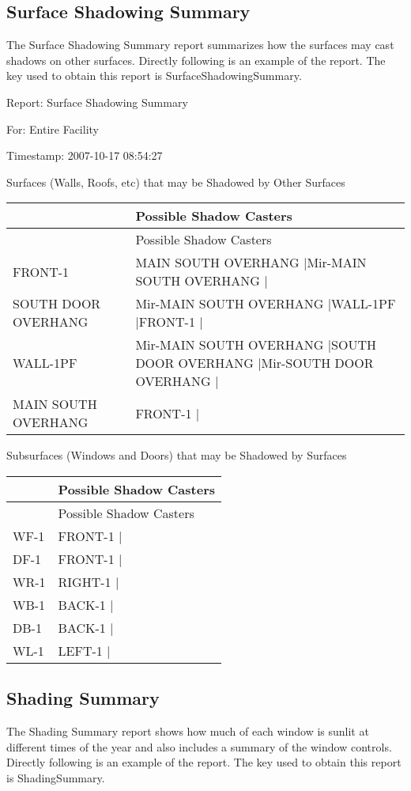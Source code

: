 \subsection{Surface Shadowing Summary}\label{surface-shadowing-summary}

The Surface Shadowing Summary report summarizes how the surfaces may cast shadows on other surfaces. Directly following is an example of the report. The key used to obtain this report is SurfaceShadowingSummary.

Report: Surface Shadowing Summary

For: Entire Facility

Timestamp: 2007-10-17 08:54:27

Surfaces (Walls, Roofs, etc) that may be Shadowed by Other Surfaces

\begin{longtable}[c]{>{\raggedright}p{1.5in}>{\raggedright}p{4.5in}}
\toprule 
~ & Possible Shadow Casters \tabularnewline
\midrule
\endfirsthead

\toprule 
~ & Possible Shadow Casters \tabularnewline
\midrule
\endhead

FRONT-1 & MAIN SOUTH OVERHANG |Mir-MAIN SOUTH OVERHANG | \tabularnewline
SOUTH DOOR OVERHANG & Mir-MAIN SOUTH OVERHANG |WALL-1PF |FRONT-1 | \tabularnewline
WALL-1PF & Mir-MAIN SOUTH OVERHANG |SOUTH DOOR OVERHANG |Mir-SOUTH DOOR OVERHANG | \tabularnewline
MAIN SOUTH OVERHANG & FRONT-1 | \tabularnewline
\bottomrule
\end{longtable}

Subsurfaces (Windows and Doors) that may be Shadowed by Surfaces

\begin{longtable}[c]{@{}ll@{}}
\toprule 
~ & Possible Shadow Casters \tabularnewline
\midrule
\endfirsthead

\toprule 
~ & Possible Shadow Casters \tabularnewline
\midrule
\endhead

WF-1 & FRONT-1 | \tabularnewline
DF-1 & FRONT-1 | \tabularnewline
WR-1 & RIGHT-1 | \tabularnewline
WB-1 & BACK-1 | \tabularnewline
DB-1 & BACK-1 | \tabularnewline
WL-1 & LEFT-1 | \tabularnewline
\bottomrule
\end{longtable}

\subsection{Shading Summary}\label{shading-summary-000}

The Shading Summary report shows how much of each window is sunlit at different times of the year and also includes a summary of the window controls. Directly following is an example of the report. The key used to obtain this report is ShadingSummary.

